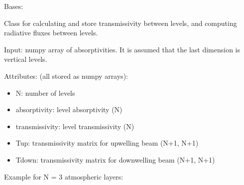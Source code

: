 \documentclass[letterpaper,10pt,english]{sphinxmanual}
\begin{document}
\begin{fulllineitems}
\label{api/climlab.radiation:climlab.radiation.transmissivity.Transmissivity}
Bases: \href{http://docs.python.org/2.7/library/functions.html\#object}{}

Class for calculating and store transmissivity between levels,
and computing radiative fluxes between levels.

Input: numpy array of absorptivities.
It is assumed that the last dimension is vertical levels.

Attributes: (all stored as numpy arrays):
\begin{itemize}
\item {} 
N: number of levels

\item {} 
absorptivity: level absorptivity (N)

\item {} 
transmissivity: level transmissivity (N)

\item {} 
Tup: transmissivity matrix for upwelling beam (N+1, N+1)

\item {} 
Tdown: transmissivity matrix for downwelling beam (N+1, N+1)

\end{itemize}

Example for N = 3 atmospheric layers:


\end{fulllineitems}
\end{document}
